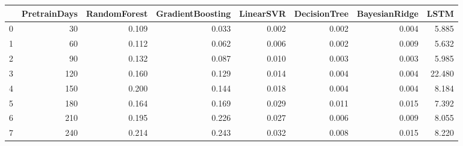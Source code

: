 \begin{tabular}{lrrrrrrr}
\toprule
{} &  PretrainDays &  RandomForest &  GradientBoosting &  LinearSVR &  DecisionTree &  BayesianRidge &   LSTM \\
\midrule
0 &            30 &         0.109 &             0.033 &      0.002 &         0.002 &          0.004 &  5.885 \\
1 &            60 &         0.112 &             0.062 &      0.006 &         0.002 &          0.009 &  5.632 \\
2 &            90 &         0.132 &             0.087 &      0.010 &         0.003 &          0.003 &  5.985 \\
3 &           120 &         0.160 &             0.129 &      0.014 &         0.004 &          0.004 & 22.480 \\
4 &           150 &         0.200 &             0.144 &      0.018 &         0.004 &          0.004 &  8.184 \\
5 &           180 &         0.164 &             0.169 &      0.029 &         0.011 &          0.015 &  7.392 \\
6 &           210 &         0.195 &             0.226 &      0.027 &         0.006 &          0.009 &  8.055 \\
7 &           240 &         0.214 &             0.243 &      0.032 &         0.008 &          0.015 &  8.220 \\
\bottomrule
\end{tabular}
